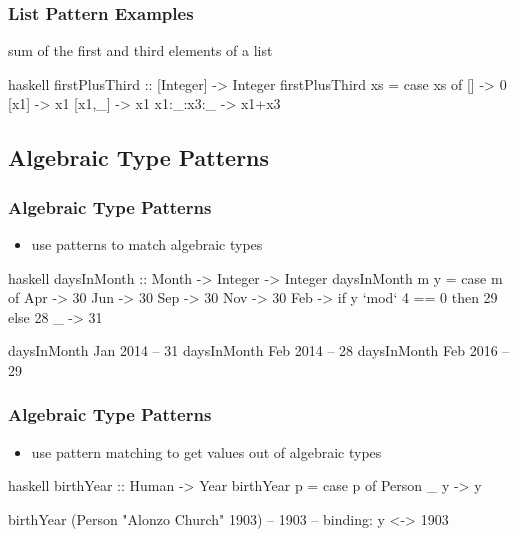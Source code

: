 \documentclass[dvipsnames]{beamer}
\theoremstyle{plain}
\begin{document}
\begin{frame}[fragile]
  \frametitle{List Pattern Examples}

  \begin{exampleblock}{sum of the first and third elements of a list}
    \begin{pygments}{haskell}
firstPlusThird :: [Integer] -> Integer
firstPlusThird xs =
    case xs of
      []        -> 0
      [x1]      -> x1
      [x1,_]    -> x1
      x1:_:x3:_ -> x1+x3
    \end{pygments}
  \end{exampleblock}
\end{frame}

\subsection{Algebraic Type Patterns}

\begin{frame}[fragile]
  \frametitle{Algebraic Type Patterns}

  \begin{itemize}
    \item use patterns to match algebraic types
  \end{itemize}

  \begin{exampleblock}{}
    \begin{pygments}{haskell}
daysInMonth :: Month -> Integer -> Integer
daysInMonth m y =
    case m of
      Apr -> 30
      Jun -> 30
      Sep -> 30
      Nov -> 30
      Feb -> if y `mod` 4 == 0 then 29 else 28
      _   -> 31

daysInMonth Jan 2014 -- 31
daysInMonth Feb 2014 -- 28
daysInMonth Feb 2016 -- 29
    \end{pygments}
  \end{exampleblock}
\end{frame}

\begin{frame}[fragile]
  \frametitle{Algebraic Type Patterns}

  \begin{itemize}
    \item use pattern matching to get values out of algebraic types
  \end{itemize}

  \begin{exampleblock}{}
    \begin{pygments}{haskell}
birthYear :: Human -> Year
birthYear p =
    case p of
      Person _ y -> y

birthYear (Person "Alonzo Church" 1903)  -- 1903
-- binding: y <-> 1903
    \end{pygments}
  \end{exampleblock}
\end{frame}
\end{document}
